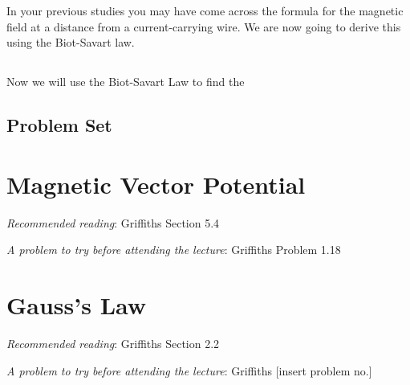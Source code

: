 \documentclass[
  letterpaper,
  DIV=11,
  numbers=noendperiod]{scrreprt}
\begin{document}
In your previous studies you may have come across the formula for the
magnetic field at a distance from a current-carrying wire. We are now
going to derive this using the Biot-Savart law.

\section{}\label{section}

Now we will use the Biot-Savart Law to find the

\section{Problem Set}\label{problem-set}


\chapter{Magnetic Vector Potential}\label{magnetic-vector-potential}

\newcommand{\l}{\mathrm{\mathbf{l}}}
\newcommand{\E}{\mathrm{\mathbf{E}}}
\newcommand{\F}{\mathrm{\mathbf{F}}}
\newcommand{\r}{\mathrm{\mathbf{r}}}

\newcommand{\x}{\mathrm{\mathbf{x}}}
\newcommand{\y}{\mathrm{\mathbf{y}}}
\newcommand{\z}{\mathrm{\mathbf{z}}}

\emph{Recommended reading}: Griffiths Section 5.4

\emph{A problem to try before attending the lecture}: Griffiths Problem
1.18


\chapter{Gauss's Law}\label{gausss-law}

\newcommand{\l}{\mathrm{\mathbf{l}}}
\newcommand{\E}{\mathrm{\mathbf{E}}}
\newcommand{\F}{\mathrm{\mathbf{F}}}
\newcommand{\r}{\mathrm{\mathbf{r}}}

\newcommand{\x}{\mathrm{\mathbf{x}}}
\newcommand{\y}{\mathrm{\mathbf{y}}}
\newcommand{\z}{\mathrm{\mathbf{z}}}

\emph{Recommended reading}: Griffiths Section 2.2

\emph{A problem to try before attending the lecture}: Griffiths
{[}insert problem no.{]}

\end{document}
